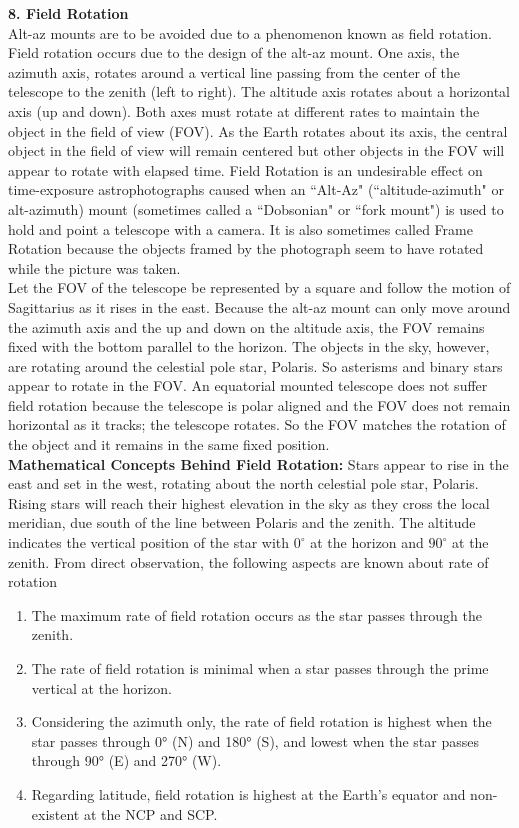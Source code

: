 \documentclass[a4paper,12pt]{extarticle}
\begin{document}
\textbf{8. Field Rotation}\\

Alt-az mounts are to be avoided due to a phenomenon
known as field rotation. Field rotation occurs due to
the design of the alt-az mount. One axis, the azimuth
axis, rotates around a vertical line passing from the
center of the telescope to the zenith (left to right). The altitude axis rotates about a horizontal axis (up and down). Both axes must rotate at different rates to maintain the object in the field of view (FOV). As the Earth rotates about its axis, the central object in the field of view will remain centered but other objects in the FOV will appear to rotate with elapsed time. Field Rotation is an undesirable effect on time-exposure astrophotographs caused when an ``Alt-Az" (``altitude-azimuth" or alt-azimuth) mount (sometimes called a ``Dobsonian" or ``fork mount") is used to hold and point a telescope with a camera. It is also sometimes called Frame Rotation because the objects framed by the photograph seem to have rotated while the picture was taken.\\

Let the FOV of the telescope be represented by a square and follow the motion of Sagittarius as it rises in the east. Because the alt-az mount can only move around the azimuth axis and the up and down
on the altitude axis, the FOV remains fixed with the bottom parallel to the horizon. The objects in the sky, however, are rotating around the celestial pole star, Polaris. So asterisms and binary stars appear to rotate in the FOV. An equatorial mounted telescope does not suffer field rotation because the telescope is polar aligned and the FOV does not remain horizontal as it tracks; the telescope rotates. So the FOV matches the rotation of the object and it remains in the same fixed position.\\

\textbf{Mathematical Concepts Behind Field Rotation:}
Stars appear to rise in the east and set in the west, rotating about the north celestial pole star, Polaris. Rising stars will reach their highest elevation in the sky as they cross the local meridian, due south of the line between Polaris and the zenith. The altitude indicates the vertical position of the star with $0^\circ$ at the horizon and $90^\circ$ at the zenith. From direct observation, the following aspects are known about rate of rotation
\begin{enumerate}
	\item The maximum rate of field rotation occurs as the star passes through the zenith.
	\item The rate of field rotation is minimal when a star passes through the prime vertical at the
	horizon.
	\item Considering the azimuth only, the rate of field rotation is highest when the star passes
	through 0° (N) and 180° (S), and lowest when
	the star passes through 90° (E) and 270° (W).
	\item Regarding latitude, field rotation is highest at the Earth’s equator and non-existent at the NCP and SCP.
\end{enumerate}
\end{document}
